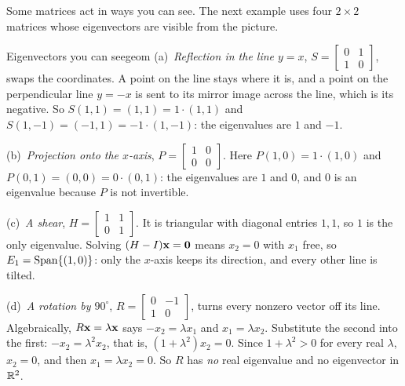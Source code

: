 \documentclass[11pt]{article}
\begin{document}
Some matrices act in ways you can see. The next example uses four $2\times2$ matrices whose eigenvectors are visible from the picture.

\begin{exmp}{Eigenvectors you can see}{geom}
(a)~\emph{Reflection in the line $y=x$}, $S=\begin{bmatrix}0&1\\1&0\end{bmatrix}$, swaps the coordinates. A point on the line stays where it is, and a point on the perpendicular line $y=-x$ is sent to its mirror image across the line, which is its negative. So $S(1,1)=(1,1)=1\cdot(1,1)$ and $S(1,-1)=(-1,1)=-1\cdot(1,-1)$: the eigenvalues are $1$ and $-1$.

(b)~\emph{Projection onto the $x$-axis}, $P=\begin{bmatrix}1&0\\0&0\end{bmatrix}$. Here $P(1,0)=1\cdot(1,0)$ and $P(0,1)=(0,0)=0\cdot(0,1)$: the eigenvalues are $1$ and $0$, and $0$ is an eigenvalue because $P$ is not invertible.

(c)~\emph{A shear}, $H=\begin{bmatrix}1&1\\0&1\end{bmatrix}$. It is triangular with diagonal entries $1,1$, so $1$ is the only eigenvalue. Solving $(H-I)\mathbf{x}=\mathbf{0}$ means $x_2=0$ with $x_1$ free, so $E_1=\operatorname{Span}\{(1,0)\}$: only the $x$-axis keeps its direction, and every other line is tilted.

(d)~\emph{A rotation by $90^\circ$}, $R=\begin{bmatrix}0&-1\\1&0\end{bmatrix}$, turns every nonzero vector off its line. Algebraically, $R\mathbf{x}=\lambda\mathbf{x}$ says $-x_2=\lambda x_1$ and $x_1=\lambda x_2$. Substitute the second into the first: $-x_2=\lambda^2x_2$, that is, $(1+\lambda^2)x_2=0$. Since $1+\lambda^2>0$ for every real $\lambda$, $x_2=0$, and then $x_1=\lambda x_2=0$. So $R$ has \emph{no} real eigenvalue and no eigenvector in $\mathbb{R}^2$.
\end{exmp}

\begin{center}
\end{center}
\end{document}
